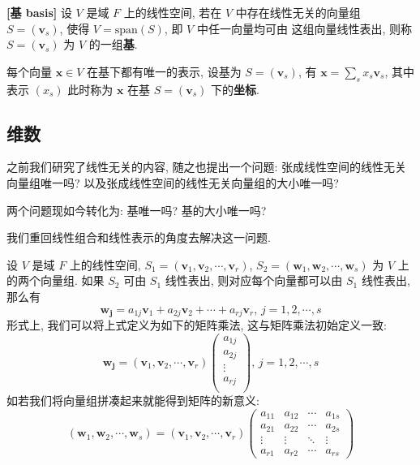 \documentclass[UTF8]{book}
\begin{document}
\begin{definition}
    \textbf{[基 basis]} 设 $V$ 是域 $F$ 上的线性空间, 
    若在 $V$ 中存在线性无关的向量组 $S=(\boldsymbol{v}_s)$, 
    使得 $V=\mathrm{span}(S)$, 即 $V$ 中任一向量均可由
    这组向量线性表出, 则称 $S=(\boldsymbol{v}_s)$ 为 
    $V$ 的一组\textbf{基}. 

    每个向量 $\boldsymbol{x}\in V$ 在基下都有唯一的表示, 
    设基为 $S=(\boldsymbol{v}_s)$, 
    有 $ \boldsymbol{x} = \sum_{s} x_s\boldsymbol{v}_s $, 
    其中表示 $(x_s)$ 此时称为 $\boldsymbol{x}$ 在基 
    $S=(\boldsymbol{v}_s)$ 下的\textbf{坐标}.
    
\end{definition}

\subsection{维数}

之前我们研究了线性无关的内容, 
随之也提出一个问题: 张成线性空间的线性无关向量组唯一吗? 
以及张成线性空间的线性无关向量组的大小唯一吗? 

两个问题现如今转化为: 基唯一吗? 基的大小唯一吗? 

我们重回线性组合和线性表示的角度去解决这一问题. 

设 $V$ 是域 $F$ 上的线性空间, 
$S_1 = (\boldsymbol{v}_1,\boldsymbol{v}_2,\cdots,\boldsymbol{v}_r)$, 
$S_2 = (\boldsymbol{w}_1,\boldsymbol{w}_2,\cdots,\boldsymbol{w}_s)$ 
为 $V$ 上的两个向量组. 
如果 $S_2$ 可由 $S_1$ 线性表出, 则对应每个向量都可以由 $S_1$ 线性表出, 
那么有 
$$ \boldsymbol{w_j} = a_{1j}\boldsymbol{v}_1 +a_{2j}\boldsymbol{v}_2
 + \cdots + a_{rj}\boldsymbol{v}_r,\,j=1,2,\cdots,s $$
形式上, 我们可以将上式定义为如下的矩阵乘法, 这与矩阵乘法初始定义一致: 
$$ \boldsymbol{w_j} = 
(\boldsymbol{v}_1,\boldsymbol{v}_2,\cdots,\boldsymbol{v}_r)
\begin{pmatrix}
    a_{1j} \\
    a_{2j} \\
    \vdots \\
    a_{rj} \\
\end{pmatrix}
,
\,j=1,2,\cdots,s $$
如若我们将向量组拼凑起来就能得到矩阵的新意义: 
\begin{equation}\label{eq vector change}
    (\boldsymbol{w}_1,\boldsymbol{w}_2,\cdots,\boldsymbol{w}_s) = 
    (\boldsymbol{v}_1,\boldsymbol{v}_2,\cdots,\boldsymbol{v}_r)
    \begin{pmatrix}
    a_{11} & a_{12} & \cdots & a_{1s} \\
    a_{21} & a_{22} & \cdots & a_{2s} \\
    \vdots & \vdots & \ddots & \vdots  \\
    a_{r1} & a_{r2} & \cdots & a_{rs} 
\end{pmatrix}
\end{equation}
\end{document}
